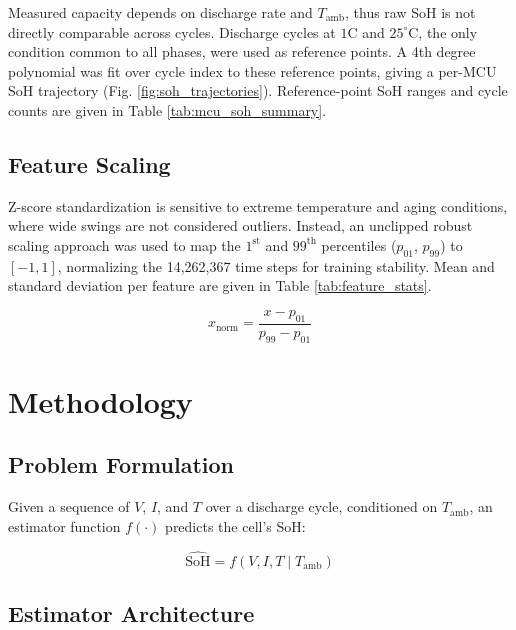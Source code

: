 \documentclass[conference]{IEEEtran}
\begin{document}
Measured capacity depends on discharge rate and $T_{\text{amb}}$, thus raw SoH is not directly comparable across cycles. Discharge cycles at $1\text{C}$ and $25^\circ\text{C}$, the only condition common to all phases, were used as reference points. A 4th degree polynomial was fit over cycle index to these reference points, giving a per-MCU SoH trajectory (Fig. \ref{fig:soh_trajectories}). Reference-point SoH ranges and cycle counts are given in Table \ref{tab:mcu_soh_summary}.



\subsection{Feature Scaling}

Z-score standardization is sensitive to extreme temperature and aging conditions, where wide swings are not considered outliers.
Instead, an unclipped robust scaling approach \cite{han2011data} was used to map the $1^{\text{st}}$ and $99^{\text{th}}$ percentiles ($p_{01}$, $p_{99}$) to $[-1, 1]$, normalizing the 14,262,367 time steps for training stability.
Mean and standard deviation per feature are given in Table \ref{tab:feature_stats}.

\begin{equation}
	x_{\text{norm}} = \frac{x - p_{01}}{p_{99} - p_{01}}
\end{equation}



\section{Methodology}

\subsection{Problem Formulation}
Given a sequence of $V$, $I$, and $T$ over a discharge cycle, conditioned on $T_{\text{amb}}$, an estimator function $f(\cdot)$ predicts the cell's $\text{SoH}$:

\begin{equation}
	\widehat{\text{SoH}} = f(V, I, T \mid T_{\text{amb}})
\end{equation}

\subsection{Estimator Architecture}
\end{document}
